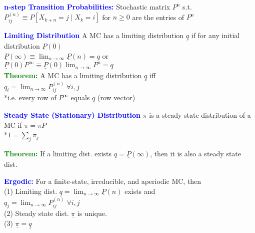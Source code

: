 \documentclass[5pt]{extarticle} %
\begin{document}
\begin{paracol}{3}
{    \textcolor{blue}{\textbf{n-step Transition Probabilities:}} Stochastic matrix $P^n$ s.t. 
    $P_{ij}^{(n)} \equiv P[X_{k+n} = j \mid X_k = i]$ for $n \geq 0$ are the entries of $P^n$ 

    \textcolor{blue}{\textbf{Limiting Distribution}} A MC has a limiting distribution $\underline{q}$ if for any initial distribution $\underline{P}(0)$ \\
    $\underline{P}(\infty) \equiv \lim_{n \rightarrow \infty} \underline{P}(n) = \underline{q}$ or \\ 
    $\underline{P}(0)P^{\infty} \equiv \underline{P}(0) \lim_{n \rightarrow \infty} P^n = \underline{q}$ \\

    \textcolor{green}{\textbf{Theorem:}} A MC has a limiting distribution $\underline{q}$ iff \\ 
    $q_i = \lim_{n \rightarrow \infty} P_{ij}^{(n)} \; \forall i,j$\\
    *i.e. every row of $P^\infty$ equals $\underline{q}$ (row vector)

    \textcolor{blue}{\textbf{Steady State (Stationary) Distribution}} $\underline{\pi}$ is a steady state distribution of a MC if $\underline{\pi} = \underline{\pi} P$ \\
    *$1 = \sum_{j} \pi_j$

    \textcolor{green}{\textbf{Theorem:}} If a limiting dist. exists $\underline{q} = \underline{P}(\infty)$, then it is also a steady state dist. 

    \textcolor{blue}{\textbf{Ergodic:}} For a finite-state, irreducible, and aperiodic MC, then \\
    (1) Limiting dist. $\underline{q} = \lim_{n \rightarrow \infty} \underline{P}(n)$ exists and \\ 
    $q_j = \lim_{n \rightarrow \infty} P_{ij}^{(n)} \; \forall i,j$ \\
    (2) Steady state dist. $\underline{\pi}$ is unique. \\ 
    (3) $\underline{\pi} = \underline{q}$

}
\end{paracol}
\end{document}
